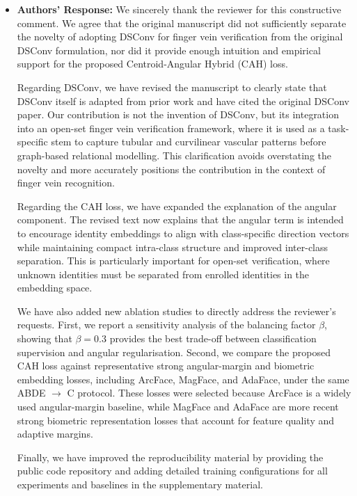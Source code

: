\documentclass[11pt]{article}
\theoremstyle{remark}
\begin{document}
\begin{itemize}
	\item \textbf{Authors' Response:} 
	We sincerely thank the reviewer for this constructive comment. We agree that the original manuscript did not sufficiently separate the novelty of adopting DSConv for finger vein verification from the original DSConv formulation, nor did it provide enough intuition and empirical support for the proposed Centroid-Angular Hybrid (CAH) loss.

	Regarding DSConv, we have revised the manuscript to clearly state that DSConv itself is adapted from prior work and have cited the original DSConv paper. Our contribution is not the invention of DSConv, but its integration into an open-set finger vein verification framework, where it is used as a task-specific stem to capture tubular and curvilinear vascular patterns before graph-based relational modelling. This clarification avoids overstating the novelty and more accurately positions the contribution in the context of finger vein recognition.

	Regarding the CAH loss, we have expanded the explanation of the angular component. The revised text now explains that the angular term is intended to encourage identity embeddings to align with class-specific direction vectors while maintaining compact intra-class structure and improved inter-class separation. This is particularly important for open-set verification, where unknown identities must be separated from enrolled identities in the embedding space.

	We have also added new ablation studies to directly address the reviewer’s requests. First, we report a sensitivity analysis of the balancing factor $\beta$, showing that $\beta=0.3$ provides the best trade-off between classification supervision and angular regularisation. Second, we compare the proposed CAH loss against representative strong angular-margin and biometric embedding losses, including ArcFace, MagFace, and AdaFace, under the same ABDE $\rightarrow$ C protocol. These losses were selected because ArcFace is a widely used angular-margin baseline, while MagFace and AdaFace are more recent strong biometric representation losses that account for feature quality and adaptive margins.

	Finally, we have improved the reproducibility material by providing the public code repository and adding detailed training configurations for all experiments and baselines in the supplementary material.


\end{itemize}
\end{document}
